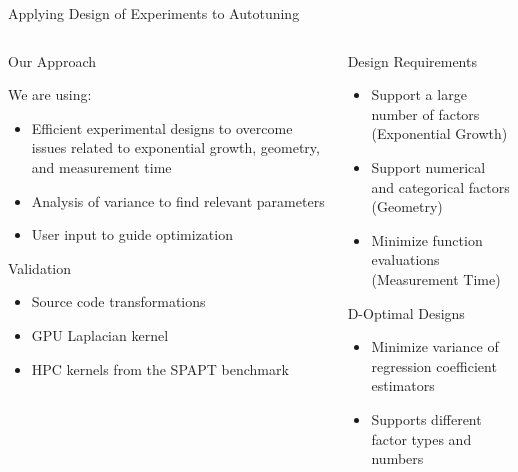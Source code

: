 \documentclass[10pt, compress, aspectratio=169, xcolor={table,usenames,dvipsnames}]{beamer}
\begin{document}
\begin{frame}[label={sec:orga447f58}]{Applying Design of Experiments to Autotuning}
\begin{columns}
\begin{column}{0.5\columnwidth}
\begin{block}{Our Approach}
\vspace{.2cm}

We are using:

\begin{itemize}
\item \alert{Efficient experimental designs} to overcome issues related to \alert{exponential growth}, \alert{geometry}, and \alert{measurement time}
\item \alert{Analysis of variance} to find \alert{relevant parameters}
\item \alert{User input} to guide optimization
\end{itemize}

\begin{block}{Validation}
\begin{itemize}
\item \alert{Source code transformations}
\item \alert{GPU Laplacian} kernel
\item HPC kernels from the \alert{SPAPT benchmark}
\end{itemize}
\end{block}
\end{block}
\end{column}

\begin{column}{0.5\columnwidth}
\begin{block}{Design Requirements}
\begin{itemize}
\item Support a large number of factors (\alert{Exponential Growth})
\item Support numerical and categorical factors (\alert{Geometry})
\item Minimize function evaluations (\alert{Measurement Time})
\end{itemize}

\begin{block}{D-Optimal Designs}
\begin{itemize}
\item Minimize \alert{variance} of \alert{regression coefficient estimators}
\item Supports different factor \alert{types} and \alert{numbers}
\end{itemize}
\end{block}
\end{block}
\end{column}
\end{columns}
\end{frame}
\end{document}
